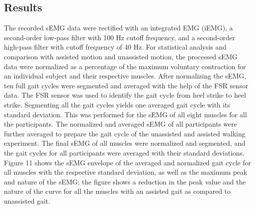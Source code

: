 \documentclass[paper,JRM,paper]{jaciiiarticle}
\begin{document}
\subsection{Results}
The recorded sEMG data were rectified with an integrated EMG (iEMG), a second-order low-pass filter with 100 Hz cutoff frequency, and a second-order high-pass filter with cutoff frequency of 40 Hz. For statistical analysis and comparison with assisted motion and unassisted motion, the processed sEMG data were normalized as a percentage of the maximum voluntary contraction for an individual subject and their respective muscles. After normalizing the sEMG, ten full gait cycles were segmented and averaged with the help of the FSR sensor data. The FSR sensor was used to identify the gait cycle from heel strike to heel strike. Segmenting all the gait cycles yields one averaged gait cycle with its standard deviation. This was performed for the sEMG of all eight muscles for all the participants. The normalized and averaged sEMG of all participants were further averaged to prepare the gait cycle of the unassisted and assisted walking experiment. The final sEMG of all muscles were normalized and segmented, and the gait cycles for all participants were averaged with their standard deviations. Figure 11 shows the sEMG envelope of the averaged and normalized gait cycle for all muscles with the respective standard deviation, as well as the maximum peak and nature of the sEMG; the figure shows a reduction in the peak value and the nature of the curve for all the muscles with an assisted gait as compared to unassisted gait.
\end{document}
